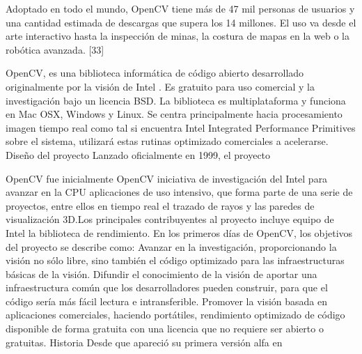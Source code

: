 \documentclass[12pt]{article}
\begin{document}
Adoptado en todo el mundo, OpenCV tiene más de 47 mil personas de usuarios y una cantidad estimada de descargas que supera los 14 millones. El uso va desde el arte interactivo hasta la inspección de minas, la costura de mapas en la web o la robótica avanzada. [33]


OpenCV, es una biblioteca informática de código abierto desarrollado originalmente por la visión de Intel . Es gratuito para uso comercial y la investigación bajo un licencia BSD. La biblioteca es multiplataforma y funciona en Mac OSX, Windows y Linux. Se centra principalmente hacia procesamiento imagen tiempo real como tal si encuentra Intel Integrated Performance Primitives sobre el sistema, utilizará estas rutinas optimizado comerciales a acelerarse.
Diseño del proyecto
Lanzado oficialmente en 1999, el proyecto


OpenCV
fue inicialmente OpenCV iniciativa de investigación del Intel para avanzar en la CPU aplicaciones de uso intensivo, que forma parte de una serie de proyectos, entre ellos en tiempo real el trazado de rayos y las paredes de visualización 3D.Los principales contribuyentes al proyecto incluye equipo de Intel la biblioteca de rendimiento. En los primeros días de OpenCV, los objetivos del proyecto se describe como:
Avanzar en la investigación, proporcionando la visión no sólo libre, sino también el código optimizado para las infraestructuras básicas de la visión.
Difundir el conocimiento de la visión de aportar una infraestructura común que los desarrolladores pueden construir, para que el código sería más fácil lectura e intransferible.
Promover la visión basada en aplicaciones comerciales, haciendo portátiles, rendimiento optimizado de código disponible de forma gratuita con una licencia que no requiere ser abierto o gratuitas.
Historia
Desde que apareció su primera versión alfa en
\end{document}
